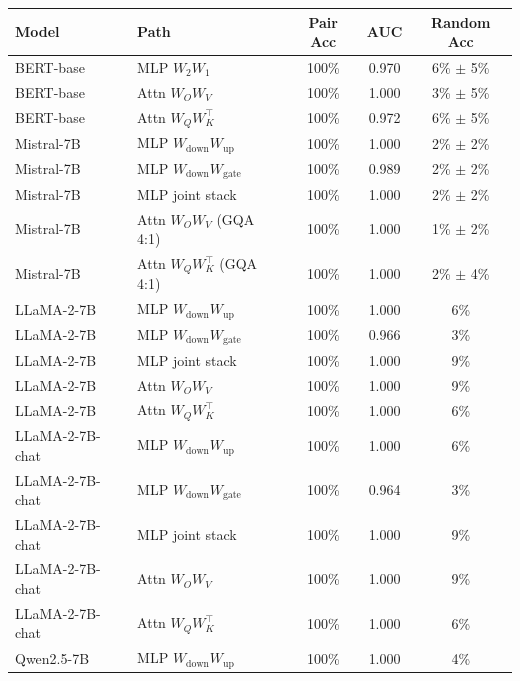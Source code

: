 \documentclass[wcp]{jmlr}
\begin{document}
\begin{table}[h]
\centering
\small
\renewcommand{\arraystretch}{1.05}
\begin{tabular}{llccc}
\toprule
Model & Path & Pair Acc & AUC & Random Acc \\
\midrule
BERT-base       & MLP $W_2 W_1$                          & 100\% & 0.970 & 6\% $\pm$ 5\% \\
BERT-base       & Attn $W_O W_V$                         & 100\% & 1.000 & 3\% $\pm$ 5\% \\
BERT-base       & Attn $W_Q W_K^\top$                    & 100\% & 0.972 & 6\% $\pm$ 5\% \\
\midrule
Mistral-7B      & MLP $W_{\text{down}} W_{\text{up}}$    & 100\% & 1.000 & 2\% $\pm$ 2\% \\
Mistral-7B      & MLP $W_{\text{down}} W_{\text{gate}}$  & 100\% & 0.989 & 2\% $\pm$ 2\% \\
Mistral-7B      & MLP joint stack                        & 100\% & 1.000 & 2\% $\pm$ 2\% \\
Mistral-7B      & Attn $W_O W_V$ (GQA 4:1)               & 100\% & 1.000 & 1\% $\pm$ 2\% \\
Mistral-7B      & Attn $W_Q W_K^\top$ (GQA 4:1)          & 100\% & 1.000 & 2\% $\pm$ 4\% \\
\midrule
LLaMA-2-7B      & MLP $W_{\text{down}} W_{\text{up}}$    & 100\% & 1.000 & 6\% \\
LLaMA-2-7B      & MLP $W_{\text{down}} W_{\text{gate}}$  & 100\% & 0.966 & 3\% \\
LLaMA-2-7B      & MLP joint stack                        & 100\% & 1.000 & 9\% \\
LLaMA-2-7B      & Attn $W_O W_V$                         & 100\% & 1.000 & 9\% \\
LLaMA-2-7B      & Attn $W_Q W_K^\top$                    & 100\% & 1.000 & 6\% \\
\midrule
LLaMA-2-7B-chat & MLP $W_{\text{down}} W_{\text{up}}$    & 100\% & 1.000 & 6\% \\
LLaMA-2-7B-chat & MLP $W_{\text{down}} W_{\text{gate}}$  & 100\% & 0.964 & 3\% \\
LLaMA-2-7B-chat & MLP joint stack                        & 100\% & 1.000 & 9\% \\
LLaMA-2-7B-chat & Attn $W_O W_V$                         & 100\% & 1.000 & 9\% \\
LLaMA-2-7B-chat & Attn $W_Q W_K^\top$                    & 100\% & 1.000 & 6\% \\
\midrule
Qwen2.5-7B      & MLP $W_{\text{down}} W_{\text{up}}$    & 100\% & 1.000 & 4\% \\

\end{tabular}
\end{table}
\end{document}
